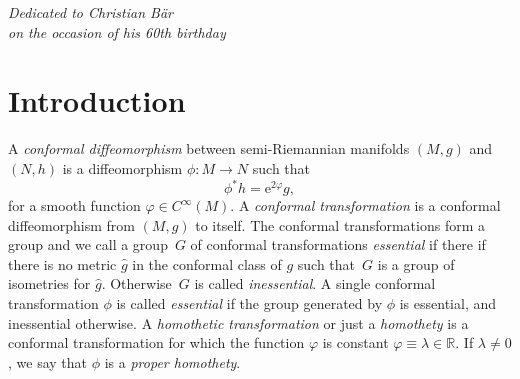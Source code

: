 \documentclass[pdftex]{sigma}
\numberwithin{equation}{section}
\newcommand{\1}{\mathbf{1}}
\newcommand{\e}{\mathrm{e}}
\newcommand{\vf}{\varphi}
\newcommand{\+}{\oplus}
\renewcommand{\=}{\equiv}
\newcommand{\R}{\mathbb{R}}
\begin{document}

\begin{flushright}
\begin{minipage}{60mm}
\em Dedicated to Christian B\"{a}r\\
on the occasion of his 60th birthday
\end{minipage}
\end{flushright}

\renewcommand{\thefootnote}{\arabic{footnote}}
\setcounter{footnote}{0}

\section{Introduction}

A {\em conformal diffeomorphism} between semi-Riemannian manifolds $(M,g)$ and $(N,h)$ is a diffeomorphism
$\phi\colon M\to N$ such that
\[\phi^*h=\e^{2\vf}g,\]
for a smooth function $\vf\in C^\infty(M)$. A {\em conformal transformation} is a conformal diffeomorphism from $(M,g)$ to itself.
The conformal transformations form a group and we call a group~$G$ of conformal transformations {\em essential} if there
if there is no metric $\hat g$ in the conformal class of $g$ such that~$G$ is a group of isometries for $\hat g$. Otherwise~$G$ is called {\em inessential}.
A single conformal transformation $\phi$ is called {\em essential} if the group generated by $\phi$ is essential, and inessential otherwise.
A {\em homothetic transformation} or just a {\em homothety} is a conformal transformation for which the function $\vf$ is constant $\vf\equiv\lambda\in \R$.
If $\lambda\not=0$, we say that $\phi$ is a {\em proper homothety}.
\end{document}
